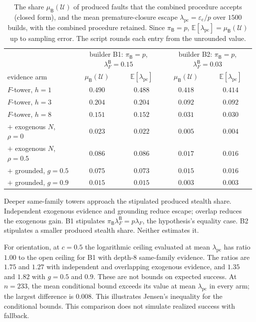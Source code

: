\documentclass[11pt]{article}
\theoremstyle{definition}
\theoremstyle{remark}
\newcommand{\lF}{\lambda_F}
\newcommand{\lpc}{\lambda_{\mathrm{pc}}}
\newcommand{\ecl}{\varepsilon_{\mathrm{c}}}
\newcommand{\Bld}{\mathsf{B}}
\newcommand{\muB}{\mu_{\Bld}}
\newcommand{\piB}{\pi_{\Bld}}
\newcommand{\lFB}{\lambda_F^{\Bld}}
\begin{document}
\begin{table}[h]
\centering
\small
\begin{tabular}{lcccc}
\toprule
& \multicolumn{2}{c}{builder B1: $\piB=p$, $\lFB=0.15$} & \multicolumn{2}{c}{builder B2: $\piB=p$, $\lFB=0.03$} \\
evidence arm & $\muB(\mathcal{U})$ & $\mathbb{E}[\lpc]$ & $\muB(\mathcal{U})$ & $\mathbb{E}[\lpc]$ \\
\midrule
$F$-tower, $h=1$ & $0.490$ & $0.488$ & $0.418$ & $0.414$ \\
$F$-tower, $h=3$ & $0.204$ & $0.204$ & $0.092$ & $0.092$ \\
$F$-tower, $h=8$ & $0.151$ & $0.152$ & $0.031$ & $0.030$ \\
$+$ exogenous $N$, $\rho=0$ & $0.023$ & $0.022$ & $0.005$ & $0.004$ \\
$+$ exogenous $N$, $\rho=0.5$ & $0.086$ & $0.086$ & $0.017$ & $0.016$ \\
$+$ grounded, $g=0.5$ & $0.075$ & $0.073$ & $0.015$ & $0.016$ \\
$+$ grounded, $g=0.9$ & $0.015$ & $0.015$ & $0.003$ & $0.003$ \\
\bottomrule
\end{tabular}
\caption{The share $\muB(\mathcal{U})$ of produced faults that the combined procedure accepts (closed
form), and the mean premature-closure escape $\lpc=\ecl/p$ over $1500$ builds, with the combined
procedure retained. Since $\piB=p$, $\mathbb{E}[\lpc]=\muB(\mathcal{U})$ up to sampling error. The
script rounds each entry from the unrounded value.}
\label{tab:simrb}
\end{table}

Deeper same-family towers approach the stipulated produced stealth share.
Independent exogenous evidence and grounding reduce escape; overlap reduces the exogenous gain.
B1 stipulates $\piB\lFB=p\lF$, the hypothesis's equality case.
B2 stipulates a smaller produced stealth share. Neither estimates it.

For orientation, at $c=0.5$ the logarithmic ceiling evaluated at mean $\lpc$ has ratio $1.00$
to the open ceiling for B1 with depth-$8$ same-family evidence.
The ratios are $1.75$ and $1.27$ with independent and overlapping exogenous evidence,
and $1.35$ and $1.82$ with $g=0.5$ and $0.9$.
These are not bounds on expected success.
At $n=233$, the mean conditional bound exceeds its value at mean $\lpc$ in every arm;
the largest difference is $0.008$.
This illustrates Jensen's inequality for the conditional bounds. This comparison does not simulate
realized success with fallback.
\end{document}
